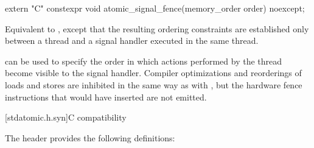 %
\begin{itemdecl}
extern "C" constexpr void atomic_signal_fence(memory_order order) noexcept;
\end{itemdecl}

\begin{itemdescr}
\pnum
\effects
Equivalent to , except that
the resulting ordering constraints are established only between a thread and a
signal handler executed in the same thread.

\pnum
\begin{note}
 can be used to specify the order in which actions
performed by the thread become visible to the signal handler.
Compiler optimizations and reorderings of loads and stores are inhibited in
the same way as with , but the hardware fence instructions
that  would have inserted are not emitted.
\end{note}
\end{itemdescr}

[stdatomic.h.syn]{C compatibility}

The header  provides the following definitions:

